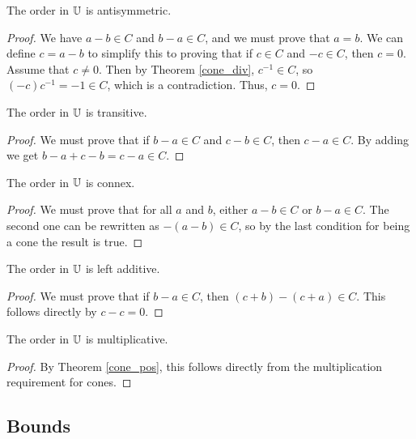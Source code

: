 \documentclass[../../math.tex]{subfiles}
\begin{document}
\begin{instance}
    The order in $\mathbb{U}$ is antisymmetric.
\end{instance}
\begin{proof}
    We have $a - b \in C$ and $b - a \in C$, and we must prove that $a = b$.  We
    can define $c = a - b$ to simplify this to proving that if $c \in C$ and $-c
    \in C$, then $c = 0$.  Assume that $c \neq 0$.  Then by Theorem
    \ref{cone_div}, $c^{-1} \in C$, so $(-c)c^{-1} = -1 \in C$, which is a
    contradiction.  Thus, $c = 0$.
\end{proof}

\begin{instance}
    The order in $\mathbb{U}$ is transitive.
\end{instance}
\begin{proof}
    We must prove that if $b - a \in C$ and $c - b \in C$, then $c - a \in C$.
    By adding we get $b - a + c - b = c - a \in C$.
\end{proof}

\begin{instance}
    The order in $\mathbb{U}$ is connex.
\end{instance}
\begin{proof}
    We must prove that for all $a$ and $b$, either $a - b \in C$ or $b - a \in
    C$.  The second one can be rewritten as $-(a - b) \in C$, so by the last
    condition for being a cone the result is true.
\end{proof}

\begin{instance}
    The order in $\mathbb{U}$ is left additive.
\end{instance}
\begin{proof}
    We must prove that if $b - a \in C$, then $(c + b) - (c + a) \in C$.  This
    follows directly by $c - c = 0$.
\end{proof}

\begin{instance}
    The order in $\mathbb{U}$ is multiplicative.
\end{instance}
\begin{proof}
    By Theorem \ref{cone_pos}, this follows directly from the multiplication
    requirement for cones.
\end{proof}

\subsection{Bounds}
\end{document}
